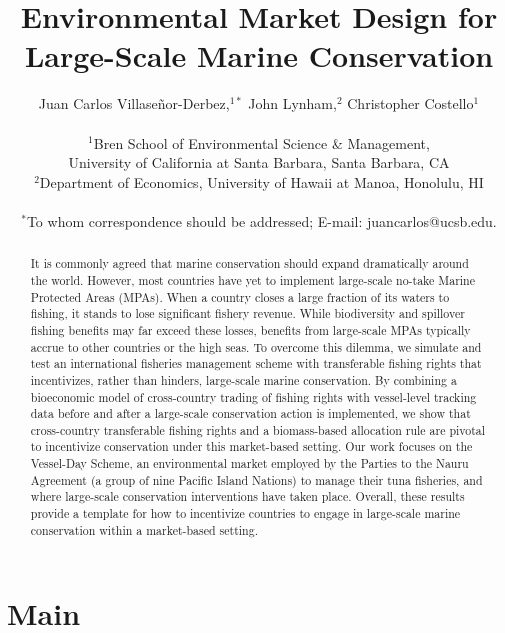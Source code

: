 \documentclass[12pt]{article}
\title{Environmental Market Design for Large-Scale Marine Conservation}
\author{Juan Carlos Villase\~{n}or-Derbez,$^{1\ast}$ John Lynham,$^{2}$ Christopher Costello$^{1}$\\
\\
\normalsize{$^{1}$Bren School of Environmental Science \& Management,}\\
\normalsize{University of California at Santa Barbara, Santa Barbara, CA}\\
\normalsize{$^{2}$Department of Economics, University of Hawaii at Manoa, Honolulu, HI}\\
\\
\normalsize{$^\ast$To whom correspondence should be addressed; E-mail: juancarlos@ucsb.edu.}
}
\date{}
\begin{document}

\baselineskip24pt


\maketitle



\begin{abstract}
It is commonly agreed that marine conservation should expand dramatically around the world. However, most countries have yet to implement large-scale no-take Marine Protected Areas (MPAs). When a country closes a large fraction of its waters to fishing, it stands to lose significant fishery revenue. While biodiversity and spillover fishing benefits may far exceed these losses, benefits from large-scale MPAs typically accrue to other countries or the high seas. To overcome this dilemma, we simulate and test an international fisheries management scheme with transferable fishing rights that incentivizes, rather than hinders, large-scale marine conservation. By combining a bioeconomic model of cross-country trading of fishing rights with vessel-level tracking data before and after a large-scale conservation action is implemented, we show that cross-country transferable fishing rights and a biomass-based allocation rule are pivotal to incentivize conservation under this market-based setting. Our work focuses on the Vessel-Day Scheme, an environmental market employed by the Parties to the Nauru Agreement (a group of nine Pacific Island Nations) to manage their tuna fisheries, and where large-scale conservation interventions have taken place. Overall, these results provide a template for how to incentivize countries to engage in large-scale marine conservation within a market-based setting.
\end{abstract}

\clearpage

\section{Main}
\end{document}
